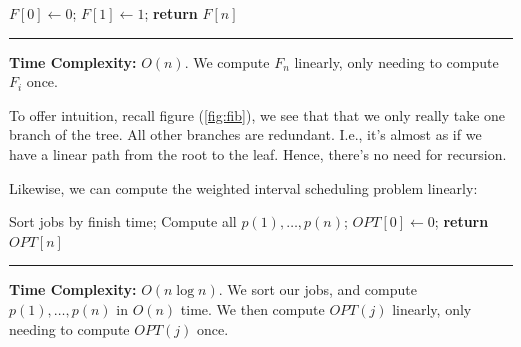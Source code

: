     \begin{Func}
        
        \vspace{-.5em}
        \begin{algorithm}[H]
            \SetAlgoLined
            $F[0] \gets 0$; $F[1] \gets 1$; 
            \textbf{return} $F[n]$\;
        \end{algorithm}
        \rule{\textwidth}{0.4pt}
        \textbf{Time Complexity:} $O(n)$. We compute $F_n$ linearly, only needing to compute $F_i$ once.
    \end{Func}
    \noindent
    To offer intuition, recall figure (\ref{fig:fib}), we see that that we only really take one branch of the tree. All other branches are 
    redundant. I.e., it's almost as if we have a linear path from the root to the leaf. Hence, there's no need for recursion.

    \newpage
    \noindent
    Likewise, we can compute the weighted interval scheduling problem linearly:
    \begin{Func}
        
        \vspace{-.5em}
        \begin{algorithm}[H]
            \SetAlgoLined
            Sort jobs by finish time; 
            Compute all $p(1),\dots,p(n)$; 
            $OPT[0] \gets 0$; 
            \textbf{return} $OPT[n]$\;
        \end{algorithm}
        \rule{\textwidth}{0.4pt}
        \textbf{Time Complexity:} $O(n\log n)$. We sort our jobs, and compute $p(1),\dots,p(n)$ in $O(n)$ time. We then compute $OPT(j)$ linearly, only needing to compute $OPT(j)$ once.
    \end{Func}
    



